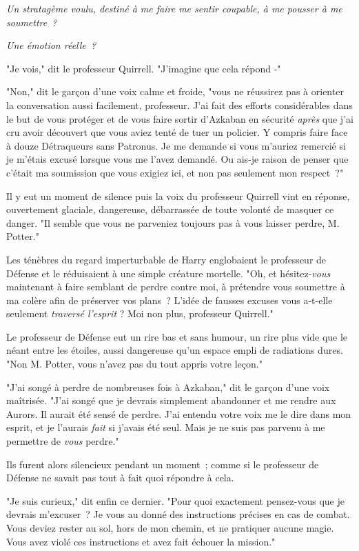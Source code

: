 \emph{Un stratagème voulu, destiné à me faire me sentir coupable, à me pousser à me soumettre~?}

\emph{Une émotion réelle~?}

"Je vois," dit le professeur Quirrell. "J'imagine que cela répond -"

"Non," dit le garçon d'une voix calme et froide, "vous ne réussirez pas à orienter la conversation aussi facilement, professeur. J'ai fait des efforts considérables dans le but de vous protéger et de vous faire sortir d'Azkaban en sécurité \emph{après} que j'ai cru avoir découvert que vous aviez tenté de tuer un policier. Y compris faire face à douze Détraqueurs sans Patronus. Je me demande si vous m'auriez remercié si je m'étais excusé lorsque vous me l'avez demandé. Ou ais-je raison de penser que c'était ma soumission que vous exigiez ici, et non pas seulement mon respect~?"

Il y eut un moment de silence puis la voix du professeur Quirrell vint en réponse, ouvertement glaciale, dangereuse, débarrassée de toute volonté de masquer ce danger. "Il semble que vous ne parveniez toujours pas à vous laisser perdre, M. Potter."

Les ténèbres du regard imperturbable de Harry englobaient le professeur de Défense et le réduisaient à une simple créature mortelle. "Oh, et hésitez-\emph{vous} maintenant à faire semblant de perdre contre moi, à prétendre vous soumettre à ma colère afin de préserver vos plans~? L'idée de fausses excuses vous a-t-elle seulement \emph{traversé l'esprit} ? Moi non plus, professeur Quirrell."

Le professeur de Défense eut un rire bas et sans humour, un rire plus vide que le néant entre les étoiles, aussi dangereuse qu'un espace empli de radiations dures. "Non M. Potter, vous n'avez pas du tout appris votre leçon."

"J'ai songé à perdre de nombreuses fois à Azkaban," dit le garçon d'une voix maîtrisée. "J'ai songé que je devrais simplement abandonner et me rendre aux Aurors. Il aurait été sensé de perdre. J'ai entendu votre voix me le dire dans mon esprit, et je l'aurais \emph{fait} si j'avais été seul. Mais je ne suis pas parvenu à me permettre de \emph{vous} perdre."

Ils furent alors silencieux pendant un moment~; comme si le professeur de Défense ne savait pas tout à fait quoi répondre à cela.

"Je suis curieux," dit enfin ce dernier. "Pour quoi exactement pensez-vous que je devrais m'excuser~? Je vous au donné des instructions précises en cas de combat. Vous deviez rester au sol, hors de mon chemin, et ne pratiquer aucune magie. Vous avez violé ces instructions et avez fait échouer la mission."

